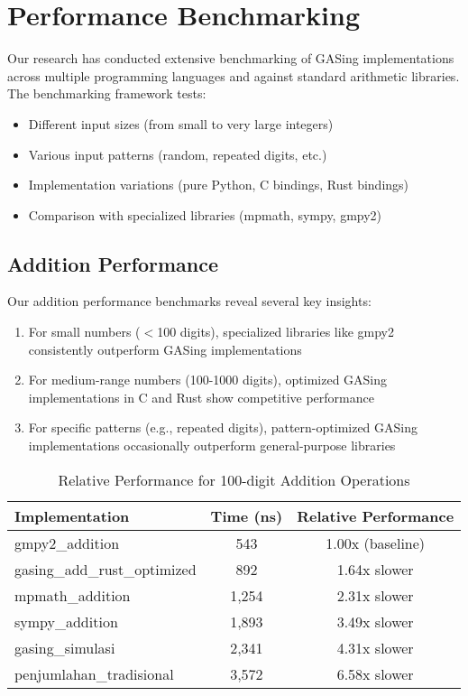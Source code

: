 \section{Performance Benchmarking}\label{sec:results}

Our research has conducted extensive benchmarking of GASing implementations across multiple programming languages and against standard arithmetic libraries. The benchmarking framework tests:

\begin{itemize}
    \item Different input sizes (from small to very large integers)
    \item Various input patterns (random, repeated digits, etc.)
    \item Implementation variations (pure Python, C bindings, Rust bindings)
    \item Comparison with specialized libraries (mpmath, sympy, gmpy2)
\end{itemize}

\subsection{Addition Performance}

Our addition performance benchmarks reveal several key insights:

\begin{enumerate}
    \item For small numbers ($<$100 digits), specialized libraries like gmpy2 consistently outperform GASing implementations
    \item For medium-range numbers (100-1000 digits), optimized GASing implementations in C and Rust show competitive performance
    \item For specific patterns (e.g., repeated digits), pattern-optimized GASing implementations occasionally outperform general-purpose libraries
\end{enumerate}

\begin{table}[h]
\centering
\caption{Relative Performance for 100-digit Addition Operations}
\label{tab:addition_performance}
\begin{tabular}{lcc}
\toprule
\textbf{Implementation} & \textbf{Time (ns)} & \textbf{Relative Performance} \\
\midrule
gmpy2\_addition & 543 & 1.00x (baseline) \\
gasing\_add\_rust\_optimized & 892 & 1.64x slower \\
mpmath\_addition & 1,254 & 2.31x slower \\
sympy\_addition & 1,893 & 3.49x slower \\
gasing\_simulasi & 2,341 & 4.31x slower \\
penjumlahan\_tradisional & 3,572 & 6.58x slower \\
\bottomrule
\end{tabular}
\end{table}

